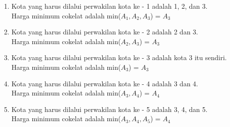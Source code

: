 \documentclass{article}
\begin{document}
\begin{enumerate}    
    \setlength\itemsep{0pt}
    \item   Kota yang harus dilalui perwakilan kota ke - 1 adalah 1, 2, dan 3.\\
            Harga minimum cokelat adalah min($A_1, A_2, A_3$) = $A_3$
    \item   Kota yang harus dilalui perwakilan kota ke - 2 adalah  2 dan 3.\\
            Harga minimum cokelat adalah min($A_2, A_3$) = $A_3$
    \item   Kota yang harus dilalui perwakilan kota ke - 3 adalah kota 3 itu sendiri.\\
            Harga minimum cokelat adalah min($A_3$) = $A_3$
    \item   Kota yang harus dilalui perwakilan kota ke - 4 adalah 3 dan 4.\\
            Harga minimum cokelat adalah min($A_3, A_4$) = $A_4$
    \item   Kota yang harus dilalui perwakilan kota ke - 5 adalah 3, 4, dan 5.\\
            Harga minimum cokelat adalah min($A_3, A_4, A_5$) = $A_4$
\end{enumerate}
\end{document}
